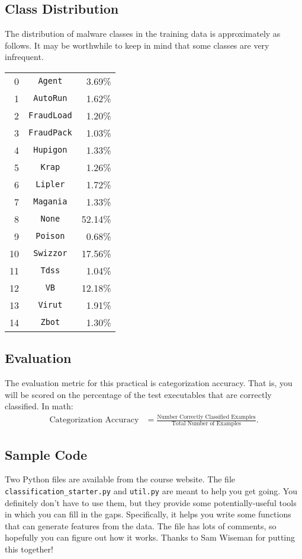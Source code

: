\documentclass[12pt]{article}
\begin{document}
\newpage 

\subsection*{Class Distribution}
The distribution of malware classes in the training data is approximately as follows. It may be worthwhile to keep in mind that some classes are very infrequent.
\begin{center}
\begin{tabular}{r c r}
    0 &\verb|Agent| & 3.69\% \\
    1 &\verb|AutoRun| & 1.62\% \\
    2 &\verb|FraudLoad| & 1.20\%\\
    3 &\verb|FraudPack| & 1.03\%\\
    4 &\verb|Hupigon| & 1.33\%\\
    5 &\verb|Krap| & 1.26\%    \\
    6 &\verb|Lipler| & 1.72\%\\
    7 &\verb|Magania| & 1.33\%\\
    8 &\verb|None| & 52.14\%\\
    9 &\verb|Poison| & 0.68\%\\
    10 &\verb|Swizzor| & 17.56\%\\
    11 &\verb|Tdss| & 1.04\%\\
    12 &\verb|VB| & 12.18\%\\
    13 &\verb|Virut| & 1.91\%\\
    14 &\verb|Zbot| & 1.30\%
    \end{tabular}
    \end{center}

\subsection*{Evaluation}
The evaluation metric for this practical is categorization accuracy. That is, you will be scored on the percentage of the test executables that are correctly classified. In math: 
\begin{align*}
    \text{Categorization Accuracy} &= \frac{\text{Number Correctly Classified Examples}}{\text{Total Number of Examples}}.
\end{align*}

\subsection*{Sample Code}
Two Python files are available from the course website.  The file \verb|classification_starter.py| and \verb|util.py| are meant to help you get going.  You definitely don't have to use them, but they provide some potentially-useful tools in which you can fill in the gaps.  Specifically, it helps you write some functions that can generate features from the data.  The file has lots of comments, so hopefully you can figure out how it works. Thanks to Sam Wiseman for putting this together!
\end{document}

